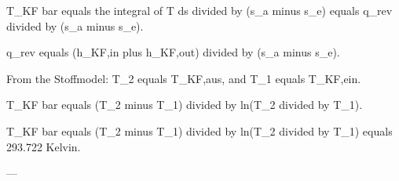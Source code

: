 T_KF bar equals the integral of T ds divided by (s_a minus s_e) equals q_rev divided by (s_a minus s_e).  

q_rev equals (h_KF,in plus h_KF,out) divided by (s_a minus s_e).  

From the Stoffmodel:  
T_2 equals T_KF,aus, and T_1 equals T_KF,ein.  

T_KF bar equals (T_2 minus T_1) divided by ln(T_2 divided by T_1).  

T_KF bar equals (T_2 minus T_1) divided by ln(T_2 divided by T_1) equals 293.722 Kelvin.  

---